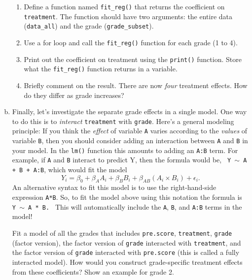 \documentclass[11pt]{article}
\begin{document}
\begin{enumerate}[a.]
\begin{enumerate}
\item Define a function named {\tt fit_reg()} that returns the coefficient on {\tt treatment}. The function should have two arguments: the entire data ({\tt data_all}) and the grade ({\tt grade_subset}).
\item Use a for loop and call the {\tt fit_reg()} function for each grade (1 to 4).
\item Print out the coefficient on treatment using the {\tt print()} function.
   Store what the {\tt fit_reg()} function returns in a variable.
\item Briefly comment on the result. There are now \textit{four} treatment effects. How do they differ as grade increases?
\end{enumerate}

\item Finally, let's investigate the separate grade effects in a single model. One 
way to do this is to \textit{interact} {\tt treatment} with {\tt grade}. Here's a general 
modeling principle: If you think the \textit{effect} of variable {\tt A} varies according to the \textit{values} of variable {\tt B}, then you should consider adding an interaction between {\tt A} and  {\tt B} in your model.  In the {\tt lm()} function this amounts to adding an {\tt A:B} term. For example,
if {\tt A} and {\tt B} interact to predict Y, then the formula would be, 
{\tt
Y $\sim$ A + B + A:B},
which would fit the model 
$$
Y_i = \beta_0 + \beta_A A_i + \beta_B B_i + \beta_{AB} (A_i \times B_i)  + \epsilon_i.
$$
An alternative syntax to fit this model is to use the right-hand-side expression {\tt A*B}. So, to fit the model above using this notation the formula is 
{\tt 
Y $\sim$ A * B. 
}
This will automatically include the {\tt A}, {\tt B}, and {\tt A:B} terms in the model!

Fit a model of all the grades that includes {\tt pre.score}, {\tt treatment}, {\tt grade} (factor version), the factor version of {\tt grade} interacted with {\tt treatment}, and the factor version of {\tt grade} interacted with {\tt pre.score}
(this is called a fully interacted model). 
How would you construct grade-specific treatment effects from these coefficients?
Show an example for grade 2.

\end{enumerate}
\end{document}
